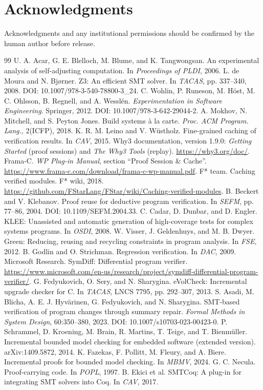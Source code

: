 \documentclass[10pt,twocolumn]{article}
\begin{document}
\section*{Acknowledgments}
Acknowledgments and any institutional permissions should be confirmed by the human author before release.
\begin{thebibliography}{99}
 U. A. Acar, G. E. Blelloch, M. Blume, and K. Tangwongsan. An experimental analysis of self-adjusting computation. In \emph{Proceedings of PLDI}, 2006.
 L. de Moura and N. Bj\o rner. Z3: An efficient SMT solver. In \emph{TACAS}, pp. 337--340, 2008. DOI: 10.1007/978-3-540-78800-3\_24.
 C. Wohlin, P. Runeson, M. H\"ost, M. C. Ohlsson, B. Regnell, and A. Wessl\'en. \emph{Experimentation in Software Engineering}. Springer, 2012. DOI: 10.1007/978-3-642-29044-2.
 A. Mokhov, N. Mitchell, and S. Peyton Jones. Build systems \`a la carte. \emph{Proc. ACM Program. Lang.}, 2(ICFP), 2018.
 K. R. M. Leino and V. W\"ustholz. Fine-grained caching of verification results. In \emph{CAV}, 2015.
 Why3 documentation, version 1.9.0: \emph{Getting Started} (proof sessions) and \emph{The Why3 Tools} (replay). \url{https://why3.org/doc/}.
 Frama-C. \emph{WP Plug-in Manual}, section ``Proof Session \& Cache''. \url{https://www.frama-c.com/download/frama-c-wp-manual.pdf}.
 F* team. Caching verified modules. F* wiki, 2018. \url{https://github.com/FStarLang/FStar/wiki/Caching-verified-modules}.
 B. Beckert and V. Klebanov. Proof reuse for deductive program verification. In \emph{SEFM}, pp. 77--86, 2004. DOI: 10.1109/SEFM.2004.33.
 C. Cadar, D. Dunbar, and D. Engler. KLEE: Unassisted and automatic generation of high-coverage tests for complex systems programs. In \emph{OSDI}, 2008.
 W. Visser, J. Geldenhuys, and M. B. Dwyer. Green: Reducing, reusing and recycling constraints in program analysis. In \emph{FSE}, 2012.
 B. Godlin and O. Strichman. Regression verification. In \emph{DAC}, 2009.
 Microsoft Research. SymDiff: Differential program verifier. \url{https://www.microsoft.com/en-us/research/project/symdiff-differential-program-verifier/}.
 G. Fedyukovich, O. Sery, and N. Sharygina. eVolCheck: Incremental upgrade checker for C. In \emph{TACAS}, LNCS 7795, pp. 292--307, 2013.
 S. Asadi, M. Blicha, A. E. J. Hyv\"arinen, G. Fedyukovich, and N. Sharygina. SMT-based verification of program changes through summary repair. \emph{Formal Methods in System Design}, 60:350--380, 2023. DOI: 10.1007/s10703-023-00423-0.
 P. Schrammel, D. Kroening, M. Brain, R. Martins, T. Teige, and T. Bienm\"uller. Incremental bounded model checking for embedded software (extended version). arXiv:1409.5872, 2014.
 K. Fazekas, F. Pollitt, M. Fleury, and A. Biere. Incremental proofs for bounded model checking. In \emph{MBMV}, 2024.
 G. C. Necula. Proof-carrying code. In \emph{POPL}, 1997.
 B. Ekici et al. SMTCoq: A plug-in for integrating SMT solvers into Coq. In \emph{CAV}, 2017.
\end{thebibliography}
\end{document}
